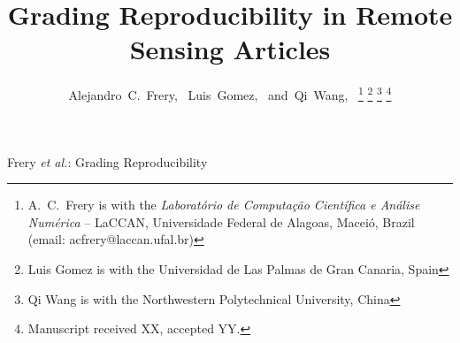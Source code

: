 \documentclass[journal]{IEEEtran}
\begin{document}
\title{Grading Reproducibility in Remote Sensing Articles}
%
%
%

\author{Alejandro~C.~Frery,~
        Luis~Gomez,~
        and~Qi~Wang,~%
\thanks{A.\ C.\ Frery is with the \textit{Laborat\'orio de Computa\c c\~ao Cient\'ifica e An\'alise Num\'erica} -- LaCCAN, Universidade Federal de Alagoas, Macei\'o, Brazil (email: acfrery@laccan.ufal.br)}%
\thanks{Luis Gomez is with the Universidad de Las Palmas de Gran Canaria, Spain}%
\thanks{Qi Wang is with the Northwestern Polytechnical University, China}%
\thanks{Manuscript received XX, accepted YY.}}

% 
%



%
{Frery \MakeLowercase{\textit{et al.}}: Grading Reproducibility}

\maketitle
\end{document}
